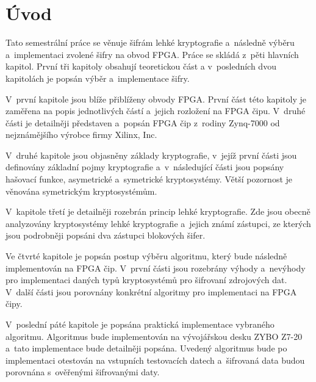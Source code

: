 \chapter*{Úvod}
{}
Tato semestrální práce se věnuje šifrám lehké kryptografie a~následně výběru a~implementaci zvolené šifry na obvod FPGA. Práce se skládá z~pěti hlavních kapitol. První tři kapitoly obsahují teoretickou část a v~posledních dvou kapitolách je popsán výběr a~implementace šifry. 

V~první kapitole jsou blíže přiblíženy obvody FPGA. První část této kapitoly je zaměřena na popis jednotlivých částí a~jejich rozložení na FPGA čipu. V~druhé části je detailněji představen a~popsán FPGA čip z~rodiny Zynq-7000 od nejznámějšího výrobce firmy Xilinx, Inc.

V~druhé kapitole jsou objasněny základy kryptografie, v~jejíž první části jsou definovány základní pojmy kryptografie a~v~následující části jsou popsány hašovací funkce, asymetrické a~symetrické kryptosystémy. Větší pozornost je věnována symetrickým kryptosystémům.

V~kapitole třetí je detailněji rozebrán princip lehké kryptografie. Zde jsou obecně analyzovány kryptosystémy lehké kryptografie a~jejich známí zástupci, ze kterých jsou podrobněji popsáni dva zástupci blokových šifer.

Ve čtvrté kapitole je popsán postup výběru algoritmu, který bude následně implementován na FPGA čip. V~první části jsou rozebrány výhody a~nevýhody pro implementaci daných typů kryptosystémů pro šifrovaní zdrojových dat. V~další části jsou porovnány konkrétní algoritmy pro implementaci na FPGA čipy.

V~poslední páté kapitole je popsána praktická implementace vybraného algoritmu. Algoritmus bude implementován na vývojářskou desku ZYBO Z7-20 a~tato implementace bude detailněji popsána. Uvedený algoritmus bude po implementaci otestován na vstupních testovacích datech a~šifrovaná data budou porovnána s~ověřenými šifrovanými daty.

